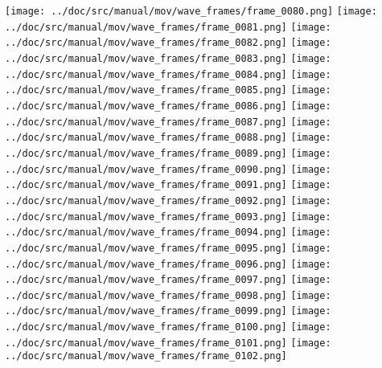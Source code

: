 \documentclass[%
oneside,                 %
final,                   %
10pt]{article}
\newenvironment{doconce:movie}{}{}
\newcounter{doconce:movie:counter}
\begin{document}
\begin{doconce:movie}
\begin{center}
\begin{animateinline}{1} %
\texttt{[image: ../doc/src/manual/mov/wave\_frames/frame\_0080.png]}
\newframe
\texttt{[image: ../doc/src/manual/mov/wave\_frames/frame\_0081.png]}
\newframe
\texttt{[image: ../doc/src/manual/mov/wave\_frames/frame\_0082.png]}
\newframe
\texttt{[image: ../doc/src/manual/mov/wave\_frames/frame\_0083.png]}
\newframe
\texttt{[image: ../doc/src/manual/mov/wave\_frames/frame\_0084.png]}
\newframe
\texttt{[image: ../doc/src/manual/mov/wave\_frames/frame\_0085.png]}
\newframe
\texttt{[image: ../doc/src/manual/mov/wave\_frames/frame\_0086.png]}
\newframe
\texttt{[image: ../doc/src/manual/mov/wave\_frames/frame\_0087.png]}
\newframe
\texttt{[image: ../doc/src/manual/mov/wave\_frames/frame\_0088.png]}
\newframe
\texttt{[image: ../doc/src/manual/mov/wave\_frames/frame\_0089.png]}
\newframe
\texttt{[image: ../doc/src/manual/mov/wave\_frames/frame\_0090.png]}
\newframe
\texttt{[image: ../doc/src/manual/mov/wave\_frames/frame\_0091.png]}
\newframe
\texttt{[image: ../doc/src/manual/mov/wave\_frames/frame\_0092.png]}
\newframe
\texttt{[image: ../doc/src/manual/mov/wave\_frames/frame\_0093.png]}
\newframe
\texttt{[image: ../doc/src/manual/mov/wave\_frames/frame\_0094.png]}
\newframe
\texttt{[image: ../doc/src/manual/mov/wave\_frames/frame\_0095.png]}
\newframe
\texttt{[image: ../doc/src/manual/mov/wave\_frames/frame\_0096.png]}
\newframe
\texttt{[image: ../doc/src/manual/mov/wave\_frames/frame\_0097.png]}
\newframe
\texttt{[image: ../doc/src/manual/mov/wave\_frames/frame\_0098.png]}
\newframe
\texttt{[image: ../doc/src/manual/mov/wave\_frames/frame\_0099.png]}
\newframe
\texttt{[image: ../doc/src/manual/mov/wave\_frames/frame\_0100.png]}
\newframe
\texttt{[image: ../doc/src/manual/mov/wave\_frames/frame\_0101.png]}
\newframe
\texttt{[image: ../doc/src/manual/mov/wave\_frames/frame\_0102.png]}
\newframe

\end{animateinline}
\end{center}
\end{doconce:movie}
\end{document}
